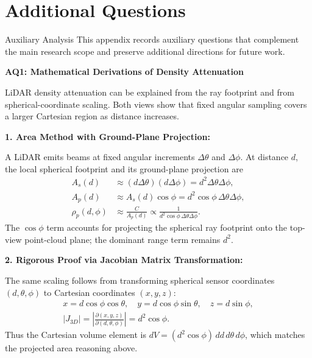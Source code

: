 \documentclass[11pt,a4paper]{report}
\renewcommand{\cftchappresnum}{Chapter~}
\newcommand{\startappendices}{%
    \appendix
    \addtocontents{toc}{\protect\renewcommand{\protect\cftchappresnum}{Appendix~}}
    \addtocontents{toc}{\protect\setlength{\protect\cftchapnumwidth}{8.0em}}
}
\newcommand{\boxitemtitle}[1]{
    \vspace{0.5em}
    {\large\textbf{\color{DeepBlue} #1}}\par
    \vspace{0.8em}
}
\begin{document}
\newpage
\startappendices

\chapter{Additional Questions}
\begin{sectionintro}{Auxiliary Analysis}
This appendix records auxiliary questions that complement the main research scope and preserve additional directions for future work.
\end{sectionintro}

\boxitemtitle{AQ1: Mathematical Derivations of Density Attenuation}
\begin{contentbox}
\setlength{\abovedisplayskip}{3pt}
\setlength{\belowdisplayskip}{3pt}
LiDAR density attenuation can be explained from the ray footprint and from spherical-coordinate scaling. Both views show that fixed angular sampling covers a larger Cartesian region as distance increases.

\vspace{0.25em}
\textbf{1. Area Method with Ground-Plane Projection:}

A LiDAR emits beams at fixed angular increments $\Delta\theta$ and $\Delta\phi$. At distance $d$, the local spherical footprint and its ground-plane projection are
\[
\begin{aligned}
A_s(d) &\approx (d\Delta\theta)(d\Delta\phi)=d^2\Delta\theta\Delta\phi,\\
A_p(d) &\approx A_s(d)\cos\phi=d^2\cos\phi\,\Delta\theta\Delta\phi,\\
\rho_p(d,\phi) &\approx \frac{C}{A_p(d)}
\propto \frac{1}{d^2\cos\phi\,\Delta\theta\Delta\phi}.
\end{aligned}
\]
The $\cos\phi$ term accounts for projecting the spherical ray footprint onto the top-view point-cloud plane; the dominant range term remains $d^2$.

\vspace{0.25em}
\textbf{2. Rigorous Proof via Jacobian Matrix Transformation:}

The same scaling follows from transforming spherical sensor coordinates $(d,\theta,\phi)$ to Cartesian coordinates $(x,y,z)$:
\[
\begin{gathered}
x = d\cos\phi\cos\theta,\quad y = d\cos\phi\sin\theta,\quad z = d\sin\phi,\\
|J_{3D}|=\left|\frac{\partial(x,y,z)}{\partial(d,\theta,\phi)}\right|=d^2\cos\phi.
\end{gathered}
\]
Thus the Cartesian volume element is $dV=(d^2\cos\phi)\,dd\,d\theta\,d\phi$, which matches the projected area reasoning above.


\end{contentbox}
\end{document}
